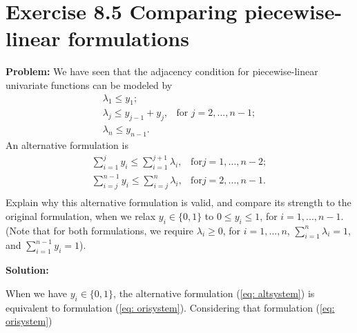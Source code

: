 \section{Exercise 8.5 Comparing piecewise-linear formulations}
\textbf{Problem:} We have seen that the adjacency condition for piecewise-linear univariate functions can be modeled by
\begin{equation}
\label{eq: orisystem}
  \begin{array}{lrcll}
    \lambda_1\leq{}y_1; &\\
    \lambda_j\leq{}y_{j-1}+y_j, & \text{for } j=2,...,n-1;\\
    \lambda_n\leq{}y_{n-1}. &
  \end{array}
\end{equation}
An alternative formulation is
\begin{equation}
\label{eq: altsystem}
  \begin{array}{lrcll}
   \sum_{i=1}^{j} y_i\leq{}\sum_{i=1}^{j+1} \lambda_i, & \text{for} j=1,...,n-2;\\
   \sum_{i=j}^{n-1} y_i\leq{}\sum_{i=j}^{n} \lambda_i, & \text{for} j=2,...,n-1.\\
  \end{array}
\end{equation}
Explain why this alternative formulation is valid, and compare its strength to the original formulation, when we relax $y_i\in\lbrace0,1\rbrace$ to $0\leq{}y_i\leq1$, for $i=1,...,n−1$. (Note that for both formulations, we require $\lambda_i\geq0$, for $i=1,...,n$, $\sum_{i=1}^{n} \lambda_i=1$, and
$\sum_{i=1}^{n-1} y_i=1$).

\textbf{Solution:} 

When we have $y_i\in\lbrace0,1\rbrace$, the alternative formulation (\ref{eq: altsystem}) is equivalent to formulation (\ref{eq: orisystem}). Considering that formulation (\ref{eq: orisystem})